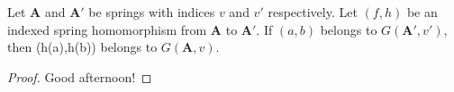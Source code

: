 %

\begin{proposition}
  Let $\boldsymbol{A}$ and $\boldsymbol{A'}$ be springs with indices $v$ and $v'$
  respectively. Let $(f,h)$ be an indexed spring homomorphism from $\boldsymbol{A}$
  to $\boldsymbol{A'}$. If $(a,b)$ belongs to $G(\boldsymbol{A'},v')$, then
  (h(a),h(b)) belongs to $G(\boldsymbol{A},v)$.
\end{proposition}
\begin{proof}
  Good afternoon!
\end{proof}
